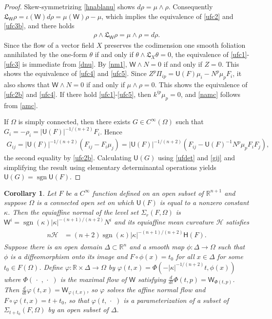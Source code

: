 \documentclass [leqno, 10pt]{amsart}
\newtheorem{corollary}[theorem]{Corollary}
\theoremstyle{definition}
\numberwithin{equation}{section}
\newcommand{\muf}{\mu}
\newcommand{\amc}{\mathcal{H}}
\newcommand{\Om}{\Omega}
\newcommand{\imt}{\iota}
\newcommand{\U}{\mathsf{U}}
\newcommand{\lc}{\Sigma}
\renewcommand{\H}{\mathsf{H}}
\newcommand{\ka}{\kappa}
\newcommand{\sff}{\Pi}
\newcommand{\dum}{\,\cdot\,\,}
\newcommand{\nm}{\mathsf{W}}
\newcommand{\cinf}{C^{\infty}}
\newcommand{\sign}{\operatorname{sgn}}
\newcommand{\lie}{\mathfrak{L}}
\newcommand{\rea}{\mathbb R}
\begin{document}
\begin{proof}
Skew-symmetrizing \eqref{hnablanu} shows $d\rho = \muf \wedge \rho$. Consequently $\lie_{\nm}\rho = \imt(\nm)d\rho = \muf(\nm)\rho - \muf$, which implies the equivalence of \eqref{ufc2} and \eqref{ufc3b}, and there holds 
\begin{align}\label{dnu}
\rho \wedge \lie_{\nm}\rho = \muf \wedge \rho  = d\rho.
\end{align}
Since the flow of a vector field $X$ preserves the codimension one smooth foliation annihilated by the one-form $\theta$ if and only if $\theta \wedge \lie_{X}\theta = 0$, the equivalence of \eqref{ufc1}-\eqref{ufc3} is immediate from \eqref{dnu}. 
By \eqref{nm1}, $\nm \wedge N = 0$ if and only if $Z =0$. This shows the equivalence of \eqref{ufc4} and \eqref{ufc5}. Since $Z^{p}\sff_{ip} = \U(F)\muf_{i} - N^{p}\muf_{p}F_{i}$, it also shows that $\nm \wedge N = 0$ if and only if $\muf \wedge \rho  = 0$. This shows the equivalence of \eqref{ufc2b} and \eqref{ufc4}. If there hold \eqref{ufc1}-\eqref{ufc5}, then $k^{ip}\muf_{p} = 0$, and \eqref{namc} follows from \eqref{amc}.

If $\Om$ is simply connected, then there exists $G \in \cinf(\Om)$ such that $G_{i} = -\rho_{i} = |\U(F)|^{-1/(n+2)}F_{i}$. Hence 
\begin{align}\label{gij}
G_{ij} = |\U(F)|^{-1/(n+2)}(F_{ij} - F_{i}\muf_{j}) = |\U(F)|^{-1/(n+2)}(F_{ij} - \U(F)^{-1}N^{p}\muf_{p}F_{i}F_{j}),
\end{align}
the second equality by \eqref{ufc2b}. Calculating $\U(G)$ using \eqref{ufdet} and \eqref{gij} and simplifying the result using elementary determinantal operations yields $\U(G) = \sign \U(F)$.
\end{proof}

\begin{corollary}\label{amccorollary}
Let $F$ be a $\cinf$ function defined on an open subset of $\rea^{n+1}$ and suppose $\Omega$ is a connected open set on which $\U(F)$ is equal to a nonzero constant $\ka$. Then the equiaffine normal of the level set $\lc_{r}(F, \Omega)$ is $\nm^{i} = \sign(\ka)|\ka|^{-(n+1)/(n+2)}N^{i}$ and its equiaffine mean curvature $\amc$ satisfies
\begin{align}
\begin{split}
n\amc & = (n+2)\sign(\ka)|\ka|^{-(n+1)/(n+2)}\H(F).
\end{split}
\end{align}
Suppose there is an open domain $\Delta \subset \rea^{n}$ and a smooth map $\phi:\Delta \to \Om$ such that $\phi$ is a diffeomorphism onto its image and $F\circ \phi(x) = t_{0}$ for all $x \in \Delta$ for some $t_{0} \in F(\Om)$. Define $\varphi:\rea \times \Delta \to \Om$ by $\varphi(t, x) = \Phi(-|\ka|^{-1/(n+2)}t, \phi(x))$ where $\Phi(\dum, \dum)$ is the maximal flow of $\nm$ satisfying $\tfrac{d}{dt}\Phi(t, p) = \nm_{\Phi(t, p)}$. Then $\tfrac{d}{dt}\varphi(t, x) = \nm_{\varphi(t, x)}$, so $\varphi$ solves the affine normal flow and $F\circ \varphi(t, x) = t + t_{0}$, so that $\varphi(t,\dum)$ is a parameterization of a subset of $\lc_{t + t_{0}}(F, \Om)$ by an open subset of $\Delta$.
\end{corollary}
\end{document}
